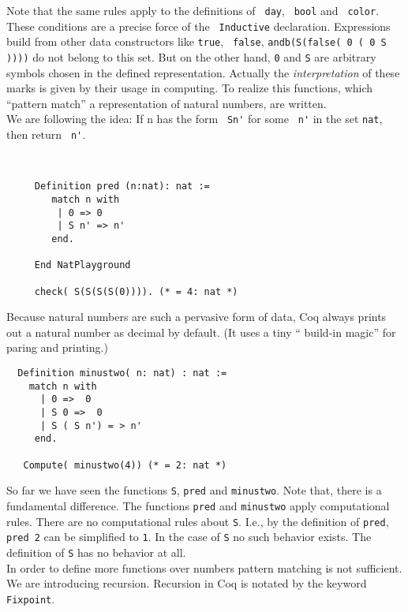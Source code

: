   Note that the same rules apply to the definitions of \lstinline! day!, \lstinline! bool! and \lstinline! color!.
  These conditions are a precise force of the \lstinline! Inductive! declaration. 
  Expressions build from other data constructors like \lstinline!true!, \lstinline! false!, \lstinline!andb(S(false( 0 ( 0 S ))))! do not belong to this set.  
  But on the other hand, \lstinline!0! and \lstinline!S! are arbitrary symbols chosen in the defined representation. 
  Actually the {\itshape interpretation} of these marks is given by their usage in computing.
  To realize this functions, which ``pattern match'' a representation of natural numbers, are written.\\  
  We are following the idea:  If n has the form \lstinline! Sn'! for some \lstinline! n'! in the set \lstinline!nat!, then return  \lstinline! n'!.
  \begin{example}~\\\vspace{-10mm}
   {\normalfont \begin{lstlisting}
  	 Definition pred (n:nat): nat :=
   		match n with 
   	     | 0 => 0
   	     | S n' => n'
   	    end. 
   	  
   	 End NatPlayground
   	 
   	 check( S(S(S(S(0)))). (* = 4: nat *)
   \end{lstlisting} 
   \normalfont}
  \end{example}
  Because natural numbers are such a pervasive form of data, Coq always prints out a natural number as decimal by default.
  (It uses a tiny `` build-in magic'' for paring and printing.)
 
  \begin{lstlisting}
  Definition minustwo( n: nat) : nat :=
    match n with
      | 0 =>  0
      | S 0 =>  0
      | S ( S n') = > n'
     end.
     
   Compute( minustwo(4)) (* = 2: nat *)
  \end{lstlisting}  
  So far we have seen the functions \lstinline!S!, \lstinline!pred! and \lstinline!minustwo!.
  Note that, there is a fundamental difference.
  The functions \lstinline!pred! and \lstinline!minustwo! apply computational rules. 
  There are no computational rules about \lstinline!S!.
  I.e., by the definition of \lstinline!pred!, \lstinline!pred 2! can be simplified to \lstinline!1!. 
  In the case of \lstinline!S! no such behavior exists.
  The definition of \lstinline!S! has no behavior at all.\\     
  In order to define more functions over numbers pattern matching is not sufficient. We are introducing recursion.
  Recursion in Coq is notated by the keyword \lstinline!Fixpoint!.
  
